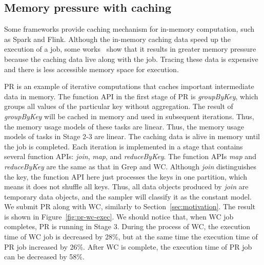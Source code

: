
\subsection{Memory pressure with caching}

Some frameworks provide caching mechanism for in-memory computation, such as Spark and Flink. Although the in-memory caching data speed up the execution of a job, some works~\cite{bu:bloat, nguyen2015facade} show that it results in greater memory pressure because the caching data live along with the job. Tracing these data is expensive and there is less accessible memory space for execution.

PR is an example of iterative computations that caches important intermediate data in memory. The function API in the first stage of PR is \textit{groupByKey}, which groups all values of the particular key without aggregation. The result of \textit{groupByKey} will be cached in memory and used in subsequent iterations. Thus, the memory usage models of these tasks are linear. Thus, the memory usage models of tasks in Stage 2-3 are linear.  The caching data is alive in memory until the job is completed. Each iteration is implemented in a stage that contains several function APIs: \textit{join}, \textit{map}, and \textit{reduceByKey}. The function APIs \textit{map} and \textit{reduceByKey} are the same as that in Grep and WC. Although \textit{join} distinguishes the key, the function API here just processes the keys in one partition, which means it does not shuffle all keys. Thus, all data objects produced by \textit{join} are temporary data objects, and the sampler will classify it as the constant model. We submit PR along with WC, similarly to Section~\ref{sec:motivation}. The result is shown in Figure~\ref{fig:pr-wc-exec}. We should notice that, when WC job completes, PR is running in Stage 3. During the process of WC, the execution time of WC job is decreased by 28\%, but at the same time the execution time of PR job increased by 26\%. After WC is complete, the execution time of PR job can be decreased by 58\%.

